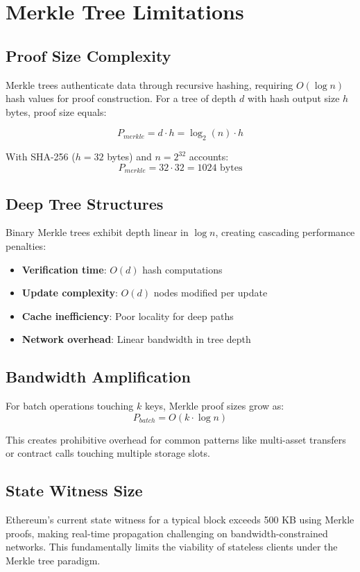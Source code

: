 \section{Merkle Tree Limitations}


\subsection{Proof Size Complexity}

Merkle trees authenticate data through recursive hashing, requiring $O(\log n)$ hash values for proof construction. For a tree of depth $d$ with hash output size $h$ bytes, proof size equals:

\begin{equation}
    P_{merkle} = d \cdot h = \log_2(n) \cdot h
\end{equation}

With SHA-256 ($h = 32$ bytes) and $n = 2^{32}$ accounts:
\begin{equation}
    P_{merkle} = 32 \cdot 32 = 1024 \text{ bytes}
\end{equation}

\subsection{Deep Tree Structures}

Binary Merkle trees exhibit depth linear in $\log n$, creating cascading performance penalties:

\begin{itemize}
    \item \textbf{Verification time}: $O(d)$ hash computations
    \item \textbf{Update complexity}: $O(d)$ nodes modified per update
    \item \textbf{Cache inefficiency}: Poor locality for deep paths
    \item \textbf{Network overhead}: Linear bandwidth in tree depth
\end{itemize}

\subsection{Bandwidth Amplification}

For batch operations touching $k$ keys, Merkle proof sizes grow as:
\begin{equation}
    P_{batch} = O(k \cdot \log n)
\end{equation}

This creates prohibitive overhead for common patterns like multi-asset transfers or contract calls touching multiple storage slots.

\subsection{State Witness Size}

Ethereum's current state witness for a typical block exceeds 500 KB using Merkle proofs, making real-time propagation challenging on bandwidth-constrained networks. This fundamentally limits the viability of stateless clients under the Merkle tree paradigm.

